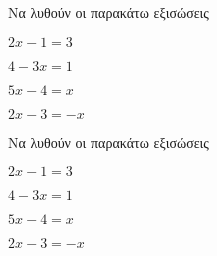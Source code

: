 Να λυθούν οι παρακάτω εξισώσεις
\begin{rlist}
\begin{multicols}{2}
\item $ 2x-1=3 $
\item $ 4-3x=1 $
\item $ 5x-4=x $
\item $ 2x-3=-x $
\end{multicols}
\end{rlist}
Να λυθούν οι παρακάτω εξισώσεις
\begin{rlist}
\begin{multicols}{2}
\item $ 2x-1=3 $
\item $ 4-3x=1 $
\item $ 5x-4=x $
\item $ 2x-3=-x $
\end{multicols}
\end{rlist}
